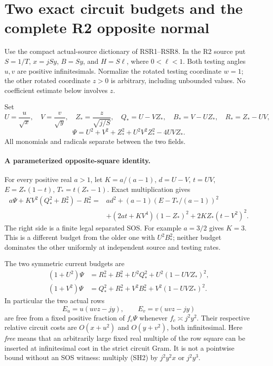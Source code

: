 \section{Two exact circuit budgets and the complete R2 opposite normal}

Use the compact actual-source dictionary of RSR1--RSR8.  In the R2
source put \(S=1/T\), \(x=jSy\), \(B=Sy\), and \(H=S\ell\), where
\(0<\ell<1\).  Both testing angles \(u,v\) are positive
infinitesimals.  Normalize the rotated testing coordinate \(w=1\);
the other rotated coordinate \(z>0\) is arbitrary, including
unbounded values.  No coefficient estimate below involves \(z\).

Set
\[
 U=\frac{u}{\sqrt x},\quad V=\frac v{\sqrt y},\quad
 Z_*=\frac z{\sqrt{j/S}},\quad
 Q_*=U-VZ_*,\quad B_*=V-UZ_*,\quad R_*=Z_*-UV,
\]
\[
 \Psi=U^2+V^2+Z_*^2+U^2V^2Z_*^2-4UVZ_*.
\]
All monomials and radicals separate between the two fields.

\paragraph{A parameterized opposite-square identity.}
For every positive real \(a>1\), let \(K=a/(a-1)\),
\(d=U-V\), \(t=UV\), \(E=Z_*(1-t)\), \(T_*=t(Z_*-1)\).
Exact multiplication gives
\[
\begin{split}
 a\Psi+K V^2(Q_*^2+B_*^2)-R_*^2
 ={}&a d^2+(a-1)(E-T_*/(a-1))^2\\
 &+(2at+KV^4)(1-Z_*)^2+2KZ_*(t-V^2)^2 .
\end{split}                                                     \tag{SH1}
\]
The right side is a finite legal separated SOS.  For example
\(a=3/2\) gives \(K=3\).  This is a different budget from the
older one with \(U^2B_*^2\); neither budget dominates the other
uniformly at independent source and testing rates.

The two symmetric current budgets are
\[
\begin{split}
 (1+U^2)\Psi&=R_*^2+B_*^2+U^2Q_*^2
                         +U^2(1-UVZ_*)^2,\\
 (1+V^2)\Psi&=Q_*^2+R_*^2+V^2B_*^2
                         +V^2(1-UVZ_*)^2 .
\end{split}                                                     \tag{SH2}
\]
In particular the two actual rows
\[
 E_u=u(uvz-jy),\qquad E_v=v(uvz-jy)                       \tag{SH3}
\]
are free from a fixed positive fraction of \(f_c\Psi\) whenever
\(f_c\asymp j^2y^2\).  Their respective relative circuit costs
are \(O(x+u^2)\) and \(O(y+v^2)\), both infinitesimal.  Here
\emph{free} means that an arbitrarily large fixed real multiple of
the row square can be inserted at infinitesimal cost in the
strict circuit Gram.  It is not a pointwise bound without an
SOS witness: multiply (SH2) by \(j^2y^2x\) or \(j^2y^3\).

